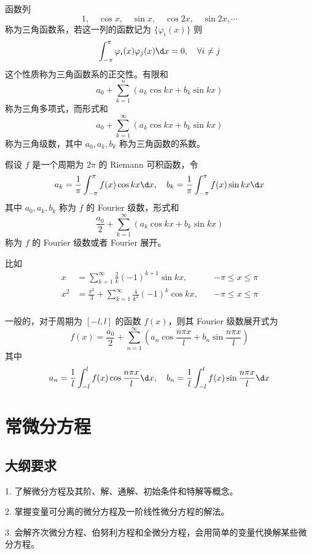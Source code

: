 函数列
\[ 1, \quad \cos x, \quad \sin x, \quad \cos 2x, \quad \sin 2x , \cdots \]
称为三角函数系，若这一列的函数记为 $\{\varphi_i(x)\}$ 则
\[ \int_{-\pi}^{\pi} \varphi_i(x) \varphi_j(x) \d x = 0, \quad \forall i \neq j \]
这个性质称为三角函数系的正交性。有限和
\[ a_0 + \sum_{k=1}^n (a_k \cos kx + b_k \sin kx) \]
称为三角多项式，而形式和
\[ a_0 + \sum_{k=1}^\infty (a_k \cos kx + b_k \sin kx) \]
称为三角级数，其中 $a_0, a_k, b_k$ 称为三角函数的系数。

\begin{definition}[Fourier 级数]
	假设 $f$ 是一个周期为 $2\pi$ 的 Riemann 可积函数，令
	\[ a_k = \frac{1}{\pi} \int_{-\pi}^{\pi} f(x) \cos kx \d x, \quad b_k = \frac{1}{\pi} \int_{-\pi}^{\pi} f(x) \sin k x \d x \]
	其中 $a_0, a_k, b_k$ 称为 $f$ 的 Fourier 级数，形式和
	\[ \frac{a_0}{2} + \sum_{k=1}^\infty (a_k \cos k x+ b_k \sin k x) \]
	称为 $f$ 的 Fourier 级数或者 Fourier 展开。
\end{definition}

比如
\[ \begin{aligned}
		x   & = \sum_{k=1}^{\infty} \frac{2}{k} (-1)^{k+1} \sin k x, \quad                   & -\pi \leqslant x \leqslant \pi \\
		x^2 & = \frac{\pi^2}{3} + \sum_{k=1}^{\infty} \frac{4}{k^2} (-1)^{k} \cos k x, \quad & -\pi \leqslant x \leqslant \pi \\
	\end{aligned} \]

一般的，对于周期为 $[-l,l]$ 的函数 $f(x)$，则其 Fourier 级数展开式为
\[ f(x) = \frac{a_0}{2} + \sum_{n=1}^{\infty} \left( a_n \cos \frac{n \pi x}{l} + b_n \sin \frac{n \pi x}{l} \right) \]
其中
\[ a_n = \frac{1}{l} \int_{-l}^{l} f(x) \cos \frac{n \pi x}{l} \d x, \quad b_n = \frac{1}{l} \int_{-l}^{l} f(x) \sin \frac{n \pi x}{l} \d x  \]


\section{常微分方程}

\subsection{大纲要求}

1. 了解微分方程及其阶、解、通解、初始条件和特解等概念。

2. 掌握变量可分离的微分方程及一阶线性微分方程的解法。

3. 会解齐次微分方程、伯努利方程和全微分方程，会用简单的变量代换解某些微分方程。

